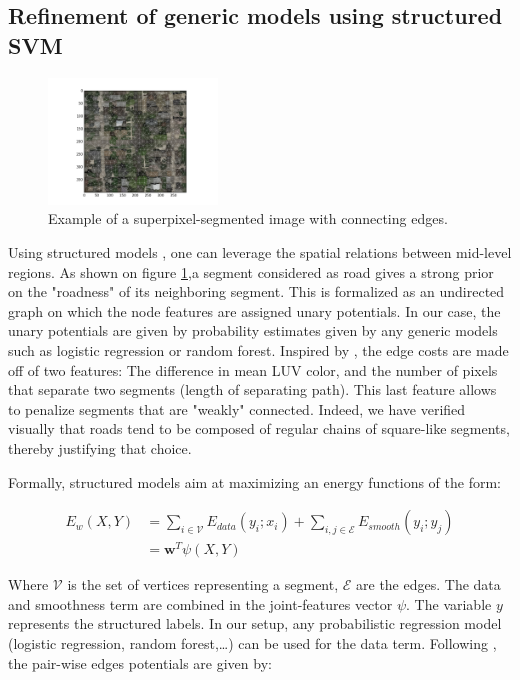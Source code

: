 \documentclass[10pt,conference,compsocconf]{IEEEtran}
\begin{document}
\subsection{Refinement of generic models using structured SVM}
\begin{figure}[htb]
\centering
\includegraphics[width=0.4\textwidth]{pics/ex_graph.png}
\caption{\label{fig:graph}
Example of a superpixel-segmented image with connecting edges.}
\end{figure}

   Using structured models \cite{tsochantaridis05}, one can leverage the spatial
   relations between mid-level regions. As shown on figure \ref{fig:graph},a
   segment considered as road gives a strong prior on the "roadness" of its
   neighboring segment. This is formalized as an undirected graph on which the
   node features are assigned unary potentials. In our case, the unary
   potentials are given by probability estimates given by any generic models such as logistic regression or random forest.
Inspired by \cite{fulkerson09}, the edge costs are made off of two features: The difference in mean LUV color, and the number of pixels that separate two segments (length of separating path). This last feature allows to penalize segments that are "weakly" connected. Indeed, we have verified visually that roads tend to be composed of regular chains of square-like segments, thereby justifying that choice.

Formally, structured models aim at maximizing an energy functions of the form:

 \begin{equation}
 \begin{split}
E_w(X,Y) &= \sum_{i \in \mathcal{V}} E_{data}(y_i;x_i) + \sum_{i,j \in \mathcal{E}} E_{smooth}(y_i;y_j) \\
 &= \mathbf{w}^T \psi(X,Y)
 \end{split}
 \end{equation}

Where \(\mathcal{V}\) is the set of vertices representing a segment, \(\mathcal{E}\) are the edges. The data and smoothness term are combined in the joint-features vector \(\psi\). The variable \(y\) represents the structured labels. In our setup, any probabilistic regression model (logistic regression, random forest,\ldots{}) can be used for the data term. Following \cite{fulkerson09}, the pair-wise edges potentials are given by:
\end{document}
